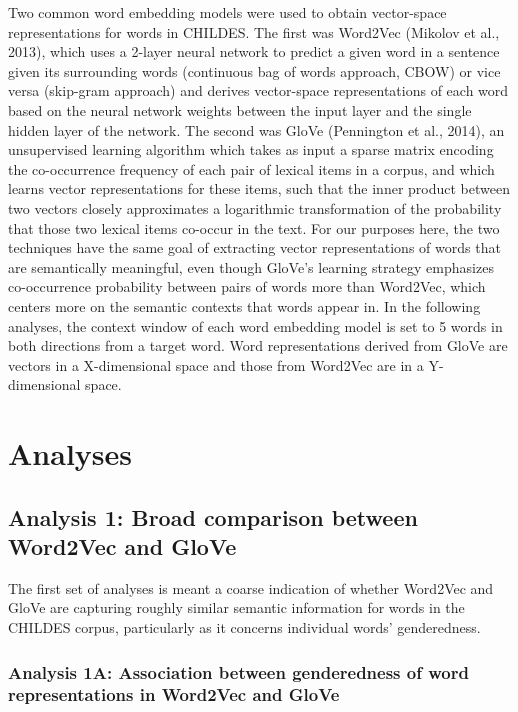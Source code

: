 \documentclass[10pt, letterpaper]{article}
\begin{document}
Two common word embedding models were used to obtain vector-space
representations for words in CHILDES. The first was Word2Vec (Mikolov et
al., 2013), which uses a 2-layer neural network to predict a given word
in a sentence given its surrounding words (continuous bag of words
approach, CBOW) or vice versa (skip-gram approach) and derives
vector-space representations of each word based on the neural network
weights between the input layer and the single hidden layer of the
network. The second was GloVe (Pennington et al., 2014), an unsupervised
learning algorithm which takes as input a sparse matrix encoding the
co-occurrence frequency of each pair of lexical items in a corpus, and
which learns vector representations for these items, such that the inner
product between two vectors closely approximates a logarithmic
transformation of the probability that those two lexical items co-occur
in the text. For our purposes here, the two techniques have the same
goal of extracting vector representations of words that are semantically
meaningful, even though GloVe's learning strategy emphasizes
co-occurrence probability between pairs of words more than Word2Vec,
which centers more on the semantic contexts that words appear in. In the
following analyses, the context window of each word embedding model is
set to 5 words in both directions from a target word. Word
representations derived from GloVe are vectors in a X-dimensional space
and those from Word2Vec are in a Y-dimensional space.

\hypertarget{analyses}{%
\section{Analyses}\label{analyses}}

\hypertarget{analysis-1-broad-comparison-between-word2vec-and-glove}{%
\subsection{Analysis 1: Broad comparison between Word2Vec and
GloVe}\label{analysis-1-broad-comparison-between-word2vec-and-glove}}

The first set of analyses is meant a coarse indication of whether
Word2Vec and GloVe are capturing roughly similar semantic information
for words in the CHILDES corpus, particularly as it concerns individual
words' genderedness.

\hypertarget{analysis-1a-association-between-genderedness-of-word-representations-in-word2vec-and-glove}{%
\subsubsection{Analysis 1A: Association between genderedness of word
representations in Word2Vec and
GloVe}\label{analysis-1a-association-between-genderedness-of-word-representations-in-word2vec-and-glove}}
\end{document}
